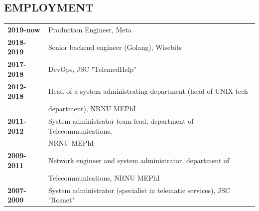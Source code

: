 \begin{resume}
\section{EMPLOYMENT}
\vspace{0.1in} 
\begin{tabular}{ll}
    {\bf 2019-now}  & Production Engineer, Meta\\
    {\bf 2018-2019} & Senior backend engineer (Golang), Wisebits\\
    {\bf 2017-2018} & DevOps, JSC "TelemedHelp"\\
    {\bf 2012-2018} & Head of a system administrating department (head of UNIX-tech\\
                    & department), NRNU MEPhI\\
    {\bf 2011-2012} & System administrator team lead, department of Telecommunications,\\
                    & NRNU MEPhI\\
    {\bf 2009-2011} & Network engineer and system administrator, department of \\
                    & Telecommunications, NRNU MEPhI\\
    {\bf 2007-2009} & System administrator (specialist in telematic services), JSC "Rosnet"\\
\end{tabular}


\end{resume}
